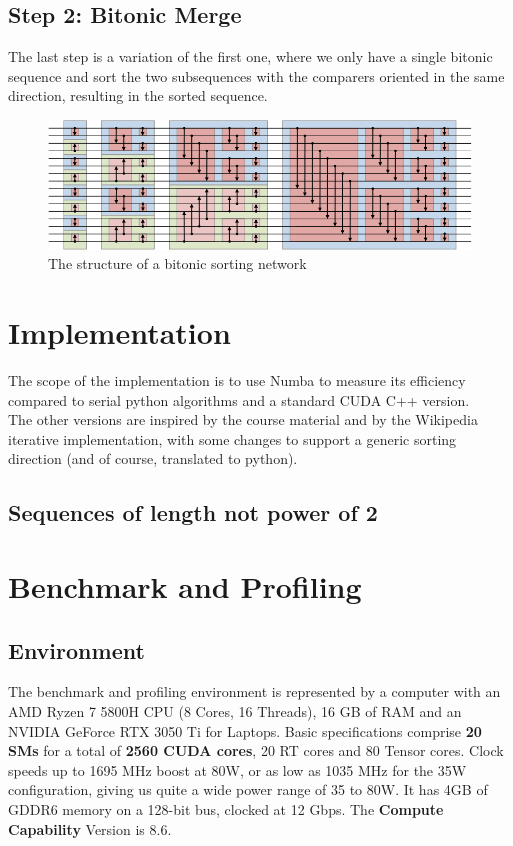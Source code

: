 \documentclass[a4paper, 12pt, oneside]{article}
\begin{document}
\subsection{Step 2: Bitonic Merge}

The last step is a variation of the first one, where we only have a single bitonic sequence and sort the two subsequences with the comparers oriented in the same direction, resulting in the sorted sequence.

\begin{figure}[!h]
  \centering
  \includegraphics[width= 400pt]{images/bitonic.png}
  \caption{The structure of a bitonic sorting network}
\end{figure}


\section{Implementation}

The scope of the implementation is to use Numba to measure its efficiency compared to serial python algorithms and a standard CUDA C++ version.\\
The other versions are inspired by the course material and by the Wikipedia iterative implementation, with some changes to support a generic sorting direction (and of course, translated to python).\\


\subsection{Sequences of length not power of 2}

\section{Benchmark and Profiling}

\subsection{Environment}
The benchmark and profiling environment is represented by a computer with an AMD Ryzen 7 5800H CPU (8 Cores, 16 Threads), 16 GB of RAM and an NVIDIA GeForce RTX 3050 Ti for Laptops.
Basic specifications comprise \textbf{20 SMs} for a total of \textbf{2560 CUDA cores}, 20 RT cores and 80 Tensor cores. Clock speeds up to 1695 MHz boost at 80W, or as low as 1035 MHz for the 35W configuration, giving us quite a wide power range of 35 to 80W.
It has 4GB of GDDR6 memory on a 128-bit bus, clocked at 12 Gbps.
The \textbf{Compute Capability} Version is 8.6.
\end{document}
